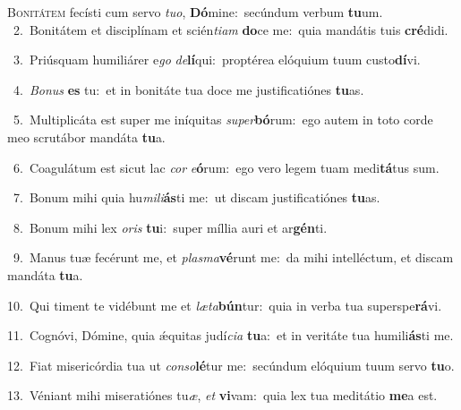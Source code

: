 \lettrine{\initial\textcolor{\initialcolor}{B}}{onitátem} fecísti cum servo \textit{tu}\-\textit{o}, \textbf{Dó}\-mine:~\star secúndum verbum \textbf{tu}\-um.\\
{\numbfont\textcolor{\numbcolor}{~2.}}~Bonitátem et disciplínam et scién\-\textit{ti}\-\textit{am} \textbf{do}\-ce me:~\star quia mandátis tuis \textbf{cré}\-didi.\par
{\numbfont\textcolor{\numbcolor}{~3.}}~Priúsquam humiliárer e\textit{go} \textit{de}\-\textbf{lí}qui:~\star proptérea elóquium tuum custo\-\textbf{dí}\-vi.\par
{\numbfont\textcolor{\numbcolor}{~4.}}~\-\textit{Bo}\-\textit{nus} \textbf{es} tu:~\star et in bonitáte tua doce me justificatiónes \textbf{tu}\-as.\par
{\numbfont\textcolor{\numbcolor}{~5.}}~Multiplicáta est super me iníquitas \textit{su}\-\textit{per}\textbf{bó}rum:~\star ego autem in toto corde meo scrutábor mandáta \textbf{tu}\-a.\par
{\numbfont\textcolor{\numbcolor}{~6.}}~Coagulátum est sicut lac \textit{cor} \textit{e}\-\textbf{ó}rum:~\star ego vero legem tuam medi\-\textbf{tá}\-tus sum.\par
{\numbfont\textcolor{\numbcolor}{~7.}}~Bonum mihi quia hu\-\textit{mi}\-\textit{li}\textbf{ás}ti me:~\star ut discam justificatiónes \textbf{tu}\-as.\par
{\numbfont\textcolor{\numbcolor}{~8.}}~Bonum mihi lex \textit{o}\-\textit{ris} \textbf{tu}\-i:~\star super míllia auri et ar\-\textbf{gén}\-ti.\par
{\numbfont\textcolor{\numbcolor}{~9.}}~Manus tuæ fecérunt me, et \textit{plas}\-\textit{ma}\textbf{vé}runt me:~\star da mihi intelléctum, et discam mandáta \textbf{tu}\-a.\par
{\numbfont\textcolor{\numbcolor}{10.}}~Qui timent te vidébunt me et \textit{læ}\-\textit{ta}\textbf{bún}tur:~\star quia in verba tua superspe\-\textbf{rá}\-vi.\par
{\numbfont\textcolor{\numbcolor}{11.}}~Cognóvi, Dómine, quia ǽquitas judí\-\textit{ci}\-\textit{a} \textbf{tu}\-a:~\star et in veritáte tua humili\-\textbf{ás}\-ti me.\par
{\numbfont\textcolor{\numbcolor}{12.}}~Fiat misericórdia tua ut \textit{con}\-\textit{so}\textbf{lé}tur me:~\star secúndum elóquium tuum servo \textbf{tu}\-o.\par
{\numbfont\textcolor{\numbcolor}{13.}}~Véniant mihi miseratiónes tu\-\textit{æ}\-, \textit{et} \textbf{vi}\-vam:~\star quia lex tua meditátio \textbf{me}\-a est.\par
